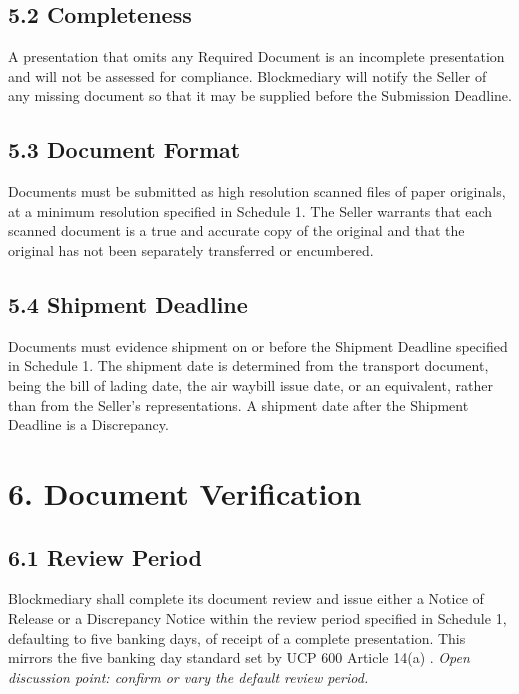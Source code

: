 \documentclass[12pt, a4paper]{article}
\begin{document}
\subsection*{5.2 Completeness}

A presentation that omits any Required Document is an incomplete presentation and will not
be assessed for compliance. Blockmediary will notify the Seller of any missing document so
that it may be supplied before the Submission Deadline.

\subsection*{5.3 Document Format}

Documents must be submitted as high resolution scanned files of paper originals, at a
minimum resolution specified in Schedule 1. The Seller warrants that each scanned document
is a true and accurate copy of the original and that the original has not been separately
transferred or encumbered.

\subsection*{5.4 Shipment Deadline}

Documents must evidence shipment on or before the Shipment Deadline specified in Schedule
1. The shipment date is determined from the transport document, being the bill of lading
date, the air waybill issue date, or an equivalent, rather than from the Seller's
representations. A shipment date after the Shipment Deadline is a Discrepancy.

\section*{6. Document Verification}

\subsection*{6.1 Review Period}

Blockmediary shall complete its document review and issue either a Notice of Release or a
Discrepancy Notice within the review period specified in Schedule 1, defaulting to five
banking days, of receipt of a complete presentation. This mirrors the five banking day
standard set by UCP 600 Article 14(a) \citep{ucp600}. \textit{Open discussion point:
confirm or vary the default review period.}
\end{document}
